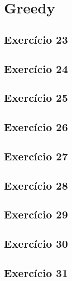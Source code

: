 \section{Greedy}\label{sec:greedy}

\subsection{Exercício 23}\label{sec:exer23}

\subsection{Exercício 24}\label{sec:exer24}

\subsection{Exercício 25}\label{sec:exer25}

\subsection{Exercício 26}\label{sec:exer26}

\subsection{Exercício 27}\label{sec:exer27}

\subsection{Exercício 28}\label{sec:exer28}

\subsection{Exercício 29}\label{sec:exer29}

\subsection{Exercício 30}\label{sec:exer30}

\subsection{Exercício 31}\label{sec:exer31}
